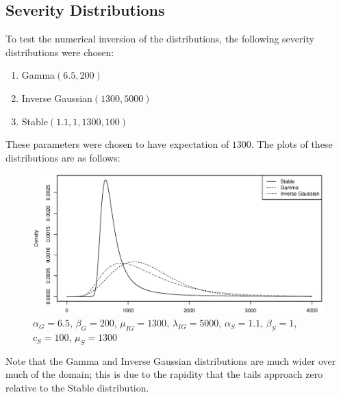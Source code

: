 \documentclass{article}
\theoremstyle{definition}
\newcommand{\adjustHeight}{\setlength{\abovecaptionskip}{-15pt}}
\begin{document}
\subsection{Severity Distributions}
To test the numerical inversion of the distributions, the following severity distributions were chosen:
\begin{enumerate}
\item Gamma\((6.5, 200)\)
\item Inverse Gaussian\((1300, 5000)\)
\item Stable\((1.1, 1, 1300, 100)\)
\end{enumerate}
These parameters were chosen to have expectation of \(1300\). The plots of these distributions are as follows:
\begin{figure}[H]
\adjustHeight

\centering
\includegraphics[width=1\textwidth]{Figure1}
\caption{\(\alpha_G=6.5\), \(\beta_G=200\), \(\mu_{IG}=1300\), \(\lambda_{IG}=5000\), \(\alpha_{S}=1.1\), \(\beta_{S}=1\), \(c_{S}=100\), \(\mu_{S}=1300\)}
\end{figure}

Note that the Gamma and Inverse Gaussian distributions are much wider over much of the domain; this is due to the rapidity that the tails approach zero relative to the Stable distribution.
\end{document}
